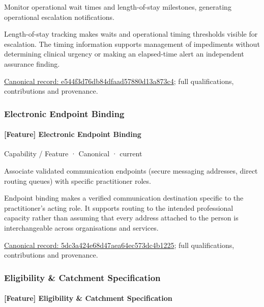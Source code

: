 Monitor operational wait times and length-of-stay milestones, generating operational escalation notifications.



Length-of-stay tracking makes waits and operational timing thresholds visible for escalation. The timing information supports management of impediments without determining clinical urgency or making an elapsed-time alert an independent assurance finding.


{\footnotesize \href{../../../../continuum/strategy/capability/feature/e544f3d76db84dfaad57880d13a873c4.md}{Canonical record: e544f3d76db84dfaad57880d13a873c4}; full qualifications, contributions and provenance.}\par
\subsubsection{Electronic Endpoint Binding}

\paragraph{[Feature] Electronic Endpoint Binding}

\label{element:5dc3a424e68d47aea64ec573dc4b1225}
{\small Capability / Feature · Canonical · current}\par

Associate validated communication endpoints (secure messaging addresses, direct routing queues) with specific practitioner roles.



Endpoint binding makes a verified communication destination specific to the practitioner's acting role. It supports routing to the intended professional capacity rather than assuming that every address attached to the person is interchangeable across organisations and services.


{\footnotesize \href{../../../../continuum/strategy/capability/feature/5dc3a424e68d47aea64ec573dc4b1225.md}{Canonical record: 5dc3a424e68d47aea64ec573dc4b1225}; full qualifications, contributions and provenance.}\par
\subsubsection{Eligibility \& Catchment Specification}

\paragraph{[Feature] Eligibility \& Catchment Specification}

